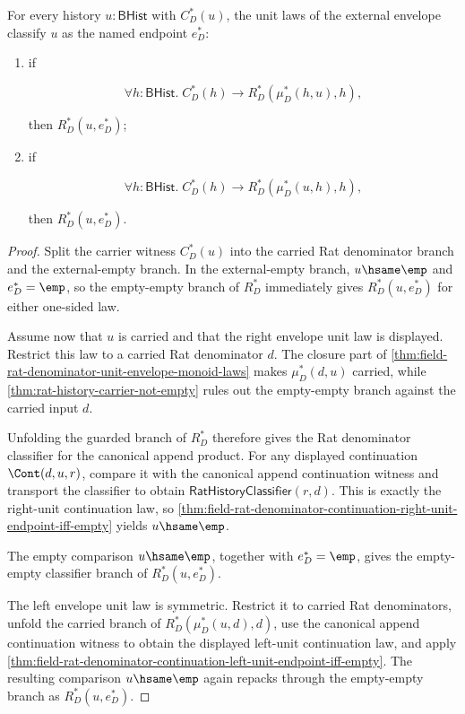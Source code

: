 \begin{theorem}
\label{thm:field-rat-denominator-unit-envelope-unit-unique}
For every history $u:\mathsf{BHist}$ with $C_D^\ast(u)$, the unit laws of the
external envelope classify $u$ as the named endpoint $e_D^\ast$:
\begin{enumerate}
  \item if

  $$
  \forall h:\mathsf{BHist}.\;
  C_D^\ast(h)\to
  R_D^\ast(\mu_D^\ast(h,u),h),
  $$

  then $R_D^\ast(u,e_D^\ast)$;
  \item if

  $$
  \forall h:\mathsf{BHist}.\;
  C_D^\ast(h)\to
  R_D^\ast(\mu_D^\ast(u,h),h),
  $$

  then $R_D^\ast(u,e_D^\ast)$.
\end{enumerate}
\end{theorem}
\begin{proof}
Split the carrier witness $C_D^\ast(u)$ into the carried Rat denominator branch
and the external-empty branch. In the external-empty branch, $u\hsame\emp$ and
$e_D^\ast=\emp$, so the empty-empty branch of $R_D^\ast$ immediately gives
$R_D^\ast(u,e_D^\ast)$ for either one-sided law.

Assume now that $u$ is carried and that the right envelope unit law is
displayed. Restrict this law to a carried Rat denominator $d$. The closure part
of \autoref{thm:field-rat-denominator-unit-envelope-monoid-laws} makes
$\mu_D^\ast(d,u)$ carried, while
\autoref{thm:rat-history-carrier-not-empty} rules out the empty-empty branch
against the carried input $d$.

Unfolding the guarded branch of $R_D^\ast$ therefore gives the Rat denominator
classifier for the canonical append product. For any displayed continuation
$\Cont(d,u,r)$, compare it with the canonical append continuation witness and
transport the classifier to obtain
$\mathsf{RatHistoryClassifier}(r,d)$. This is exactly the right-unit
continuation law, so
\autoref{thm:field-rat-denominator-continuation-right-unit-endpoint-iff-empty}
yields $u\hsame\emp$.

The empty comparison $u\hsame\emp$, together with $e_D^\ast=\emp$, gives the
empty-empty classifier branch of $R_D^\ast(u,e_D^\ast)$.

The left envelope unit law is symmetric. Restrict it to carried Rat
denominators, unfold the carried branch of
$R_D^\ast(\mu_D^\ast(u,d),d)$, use the canonical append continuation witness to
obtain the displayed left-unit continuation law, and apply
\autoref{thm:field-rat-denominator-continuation-left-unit-endpoint-iff-empty}.
The resulting comparison $u\hsame\emp$ again repacks through the empty-empty
branch as $R_D^\ast(u,e_D^\ast)$.
\end{proof}

